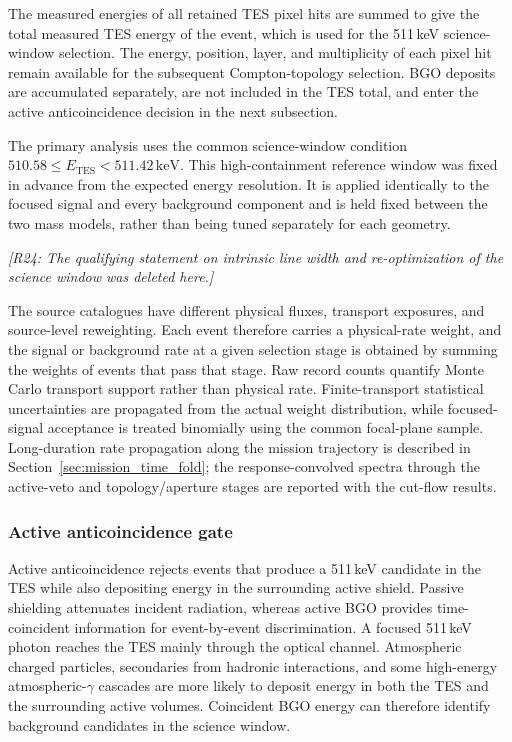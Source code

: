 \documentclass[11pt]{article}
\newcommand{\revdeleted}[1]{\par\noindent\textcolor{revisionblue}{\small\itshape [#1]}\par}
\newcommand{\revblue}[1]{\textcolor{revisionblue}{#1}}
\newcommand{\keV}{\ensuremath{\,\mathrm{keV}}}
\begin{document}
The measured energies of all retained TES pixel hits are summed to give the total
measured TES energy of the event, which is used for the 511\,keV science-window
selection. The energy, position, layer, and multiplicity of each pixel hit remain
available for the subsequent Compton-topology selection. BGO deposits are
accumulated separately, are not included in the TES total, and enter the active
anticoincidence decision in the next subsection.

The primary analysis uses the common science-window condition
$510.58\leq E_{\mathrm{TES}}<511.42\keV$. This
high-containment reference window was fixed in advance from the expected energy
resolution. It is applied identically to the focused signal and every background
component and is held fixed between the two mass models, rather than being tuned
separately for each geometry.

\revdeleted{R24: The qualifying statement on intrinsic line width and re-optimization of the science window was deleted here.}

The source catalogues have different physical fluxes, transport exposures, and
source-level reweighting. Each event therefore carries a physical-rate weight,
and the signal or background rate at a given selection stage is obtained by
summing the weights of events that pass that stage. Raw record counts quantify
Monte Carlo transport support rather than physical rate. Finite-transport
statistical uncertainties are propagated from the actual weight distribution,
while focused-signal acceptance is treated binomially using the common focal-plane
sample. Long-duration rate propagation along the mission trajectory is described
in Section~\ref{sec:mission_time_fold}; the response-convolved spectra through
the active-veto and topology/aperture stages are reported with the cut-flow results.

\subsubsection{Active anticoincidence gate}

Active anticoincidence rejects events that produce a 511\,keV candidate in the
TES while also depositing energy in the surrounding active shield. Passive
shielding attenuates incident radiation, whereas active BGO provides
time-coincident information for event-by-event discrimination. A focused
511\,keV photon reaches the TES mainly through the optical channel. Atmospheric
charged particles, secondaries from hadronic interactions, and some
\revblue{high-energy atmospheric-$\gamma$ cascades} are more likely to deposit energy in both the TES
and the surrounding active volumes. Coincident BGO energy can therefore
identify background candidates in the science window.
\end{document}
